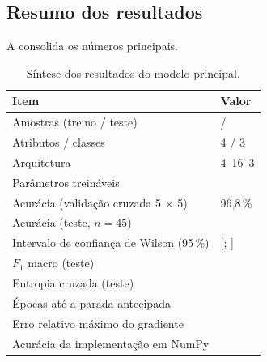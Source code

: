 \subsection{Resumo dos resultados}

A  consolida os números principais.

\begin{table}[htbp]
	\centering
	\caption{Síntese dos resultados do modelo principal.}
	\label{tab:resumo}
	\small
	\begin{tabular}{L{7.4cm} R{3.2cm}}
		\toprule
		\textbf{Item} & \textbf{Valor} \\
		\midrule
		Amostras (treino / teste) & \nTreino{} / \nTeste{} \\
		Atributos / classes & 4 / 3 \\
		Arquitetura & 4--16--3 \\
		Parâmetros treináveis & \parametrosMLP{} \\
		Acurácia (validação cruzada 5 $\times$ 5) & 96,8\,\% \\
		Acurácia (teste, $n=45$) & \accTeste{} \\
		Intervalo de confiança de Wilson (95\,\%) & [\icLo{}; \icHi{}] \\
		$F_1$ macro (teste) & \fmacroTeste{} \\
		Entropia cruzada (teste) & \llteste{} \\
		Épocas até a parada antecipada & \nIter{} \\
		Erro relativo máximo do gradiente & \erroGrad{} \\
		Acurácia da implementação em NumPy & \accNumpy{} \\
		\bottomrule
	\end{tabular}
\end{table}
